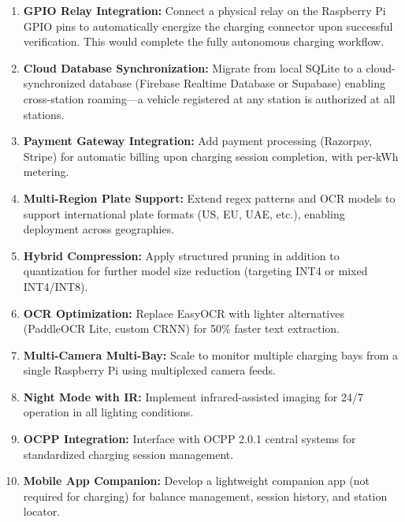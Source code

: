 \begin{enumerate}

    \item \textbf{GPIO Relay Integration:} Connect a physical relay on the Raspberry Pi GPIO pins to automatically energize the charging connector upon successful verification. This would complete the fully autonomous charging workflow.

    \item \textbf{Cloud Database Synchronization:} Migrate from local SQLite to a cloud-synchronized database (Firebase Realtime Database or Supabase) enabling cross-station roaming---a vehicle registered at any station is authorized at all stations.

    \item \textbf{Payment Gateway Integration:} Add payment processing (Razorpay, Stripe) for automatic billing upon charging session completion, with per-kWh metering.

    \item \textbf{Multi-Region Plate Support:} Extend regex patterns and OCR models to support international plate formats (US, EU, UAE, etc.), enabling deployment across geographies.

    \item \textbf{Hybrid Compression:} Apply structured pruning in addition to quantization for further model size reduction (targeting INT4 or mixed INT4/INT8).

    \item \textbf{OCR Optimization:} Replace EasyOCR with lighter alternatives (PaddleOCR Lite, custom CRNN) for 50\% faster text extraction.

    \item \textbf{Multi-Camera Multi-Bay:} Scale to monitor multiple charging bays from a single Raspberry Pi using multiplexed camera feeds.

    \item \textbf{Night Mode with IR:} Implement infrared-assisted imaging for 24/7 operation in all lighting conditions.

    \item \textbf{OCPP Integration:} Interface with OCPP 2.0.1 central systems for standardized charging session management.

    \item \textbf{Mobile App Companion:} Develop a lightweight companion app (not required for charging) for balance management, session history, and station locator.

\end{enumerate}

